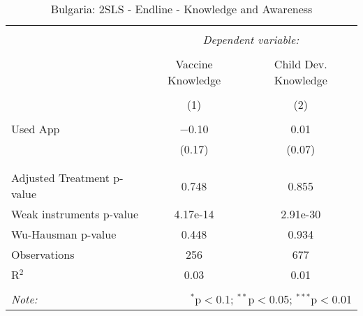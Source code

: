
\begin{table}[!htbp] \centering 
  \caption{Bulgaria: 2SLS - Endline - Knowledge and Awareness} 
  \label{tbl:Bulgaria: 2SLS - Endline - Knowledge and Awareness} 
\begin{tabular}{@{\extracolsep{5pt}}lcc} 
\\[-1.8ex]\hline 
\hline \\[-1.8ex] 
 & \multicolumn{2}{c}{\textit{Dependent variable:}} \\ 
\cline{2-3} 
\\[-1.8ex] & Vaccine Knowledge & Child Dev. Knowledge \\ 
\\[-1.8ex] & (1) & (2)\\ 
\hline \\[-1.8ex] 
 Used App & $-$0.10 & 0.01 \\ 
  & (0.17) & (0.07) \\ 
  & & \\ 
\hline \\[-1.8ex] 
Adjusted Treatment p-value & 0.748 & 0.855 \\ 
Weak instruments p-value & 4.17e-14 & 2.91e-30 \\ 
Wu-Hausman p-value & 0.448 & 0.934 \\ 
Observations & 256 & 677 \\ 
R$^{2}$ & 0.03 & 0.01 \\ 
\hline 
\hline \\[-1.8ex] 
\textit{Note:}  & \multicolumn{2}{r}{$^{*}$p$<$0.1; $^{**}$p$<$0.05; $^{***}$p$<$0.01} \\ 
\end{tabular} 
\end{table} 
